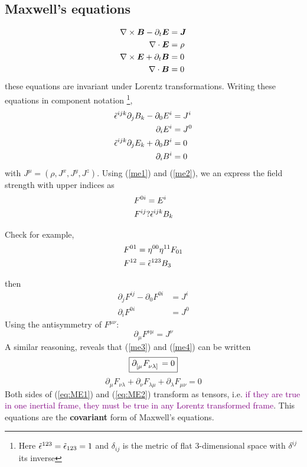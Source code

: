 \subsection{Maxwell's equations}
\begin{align}\label{Maxwell's equations-1}
    \nabla\times\vb*{B}-\partial_t\vb*{E}&=\vb*{J}\\
    \nabla\cdot\vb*{E}&=\rho\\
    \nabla\times\vb*{E}+\partial_t\vb*{B}&=0\\
    \nabla\cdot\vb*{B}&=0
\end{align}
these equations are invariant under Lorentz transformations.
Writing these equations in component notation \footnote{Here $\Tilde{\epsilon}^{123}=\Tilde{\epsilon}_{123}=1$ and $\delta_{ij}$ is the metric of flat $3$-dimensional space with $\delta^{ij}$ its inverse},
\begin{align}
    \label{me1}\Tilde{\epsilon}^{ijk}\partial_j B_k-\partial_0 E^{i}&=J^{i}\\
    \label{me2}\partial_i E^{i}&=J^0\\
    \label{me3}\Tilde{\epsilon}^{ijk}\partial_j E_k+\partial_0 B^{i}&=0\\
    \partial_i B^{i}&=0\label{me4}
\end{align}
with $J^\mu=(\rho,J^x,J^y,J^z)$.
Using (\ref{me1}) and (\ref{me2}), we an express the field strength with upper indices as
\begin{align*}
    F^{0i}&=E^{i}\\
    F^{ij}&?\Tilde{\epsilon}^{ijk}B_k
\end{align*}
\begin{tcolorbox}
    Check for example,
    \begin{align*}
        F^{01}&=\eta^{00}\eta^{11}F_{01}\\
        F^{12}&=\Tilde{\epsilon}^{123}B_3
    \end{align*}
\end{tcolorbox}
then
\begin{align}
    \partial_jF^{ij}-\partial_0 F^{0i}&=J^{i}\\
    \partial_i F^{0i}&=J^0
\end{align}
Using the antisymmetry of $F^{\mu\nu}$:
\begin{equation}\label{eq:ME1}
    \boxed{\partial_\mu F^{\nu\mu}=J^\nu}
\end{equation}
A similar reasoning, reveals that (\ref{me3}) and (\ref{me4}) can be written
\begin{equation}\label{eq:ME2}
    \boxed{\tensor{\partial}{_{[\mu}}\tensor{F}{_{\nu\lambda]}}=0}
\end{equation}
\begin{equation*}
    \partial_\mu F_{\nu\lambda}+\partial_\nu F_{\lambda\mu}+\partial_\lambda F_{\mu\nu}=0
\end{equation*}
Both sides of (\ref{eq:ME1}) and (\ref{eq:ME2}) transform as tensors, i.e. \textcolor{purple}{if they are true in one inertial frame, they must be true in any Lorentz transformed frame}. This equations are the \textbf{covariant} form of Maxwell's equations.

